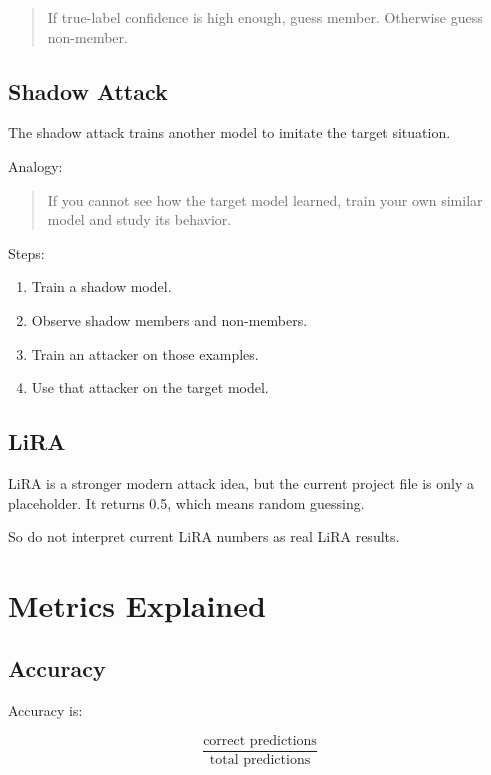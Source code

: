\documentclass[11pt,a4paper]{article}
\newcommand{\code}[1]{\texttt{\detokenize{#1}}}
\begin{document}
\begin{quote}
If true-label confidence is high enough, guess member. Otherwise guess non-member.
\end{quote}

\subsection{Shadow Attack}

The shadow attack trains another model to imitate the target situation.

Analogy:

\begin{quote}
If you cannot see how the target model learned, train your own similar model and study its behavior.
\end{quote}

Steps:
\begin{enumerate}
  \item Train a shadow model.
  \item Observe shadow members and non-members.
  \item Train an attacker on those examples.
  \item Use that attacker on the target model.
\end{enumerate}

\subsection{LiRA}

LiRA is a stronger modern attack idea, but the current project file \code{lira_attack.py} is only a placeholder. It returns 0.5, which means random guessing.

So do not interpret current LiRA numbers as real LiRA results.

\section{Metrics Explained}

\subsection{Accuracy}

Accuracy is:

\[
\frac{\text{correct predictions}}{\text{total predictions}}
\]
\end{document}
